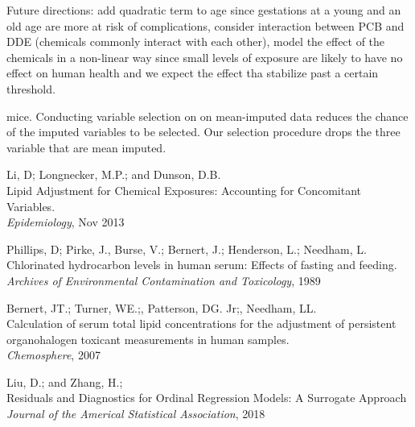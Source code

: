 \documentclass[wcp]{jmlr}%
\begin{document}
Future directions: add quadratic term to age since gestations at a young and an old age are more at risk of complications, consider interaction between PCB and DDE (chemicals commonly interact with each other), model the effect of the chemicals in a non-linear way since small levels of exposure are likely to have no effect on human health and we expect the effect tha stabilize past a certain threshold.

mice. Conducting variable selection on on mean-imputed data reduces the chance of the imputed variables to be selected. Our selection procedure drops the three variable that are mean imputed.



\begin{thebibliography}{99} %
	
	 Li, D; Longnecker, M.P.; and Dunson, D.B. \\
	\newblock Lipid Adjustment for Chemical Exposures: Accounting for Concomitant Variables.\\
	\newblock \emph{Epidemiology}, Nov 2013
	
	Phillips, D; Pirke, J., Burse, V.; Bernert, J.; Henderson, L.; Needham, L.\\
	\newblock Chlorinated hydrocarbon levels in human serum: Effects of fasting and feeding.\\
	\newblock \emph{Archives of Environmental Contamination and Toxicology}, 1989
	
	 Bernert, JT.; Turner, WE.;, Patterson, DG. Jr;, Needham, LL.\\
	\newblock Calculation of serum total lipid concentrations for the adjustment of persistent organohalogen toxicant measurements in human samples.\\
	\newblock \emph{Chemosphere}, 2007
	
	 Liu, D.; and Zhang, H.;\\
	\newblock Residuals and Diagnostics for Ordinal Regression Models: A Surrogate Approach\\
	\newblock \emph{Journal of the Americal Statistical Association}, 2018
	
\end{thebibliography}


\newpage
\appendix
\end{document}
